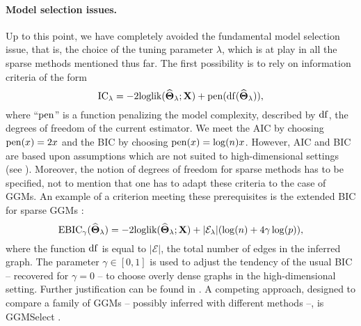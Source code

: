 
\paragraph*{Model  selection  issues.}   Up  to this  point,  we  have
completely avoided the fundamental model selection issue, that is, the
choice of the tuning parameter $\lambda$,  which is at play in all the
sparse methods mentioned  thus far.  The first possibility  is to rely
on information criteria of the form
\begin{equation*}
  \textrm{IC}_\lambda = - 2 \textrm{loglik}(\widehat{\boldsymbol\Theta}_\lambda;\mathbf{X}) + \mathrm{pen}(\mathrm{df}(\widehat{\boldsymbol\Theta}_\lambda)),
\end{equation*}
where  ``$\mathrm{pen}$''  is  a  function penalizing  the  model  complexity,
described by $\mathrm{df}$,  the degrees of freedom of  the current estimator.
We meet the AIC  by choosing $\mathrm{pen}(x) = 2 x $ and  the BIC by choosing
$\mathrm{pen}(x)  =  \log(n)  x$.   However,   AIC  and  BIC  are  based  upon
assumptions  which are  not suited  to high-dimensional  settings (see
\cite{2012_SS_Giraud}).  Moreover,  the notion  of degrees  of freedom
for sparse methods has to be specified, not to mention that one has to
adapt these criteria  to the case of GGMs.  An  example of a criterion
meeting  these  prerequisites is  the  extended  BIC for  sparse  GGMs
\cite{foygel2010extended}:
\begin{equation}
  \label{eq:EBIC_ggm}
  \text{EBIC}_\gamma(\widehat{\invcov}_\lambda)  =   -2 \textrm{loglik}
  (\widehat{\invcov}_\lambda;\bX) + |\mathcal{E}_\lambda| (\log(n) + 4 \gamma \log(p) ),
\end{equation}
where the function $\mathrm{df}$ is equal to $|\mathcal{E}|$, the total number
of edges  in the  inferred graph. The  parameter $\gamma\in  [0,1]$ is
used  to  adjust the  tendency  of  the  usual  BIC --  recovered  for
$\gamma=0$ --  to choose overly  dense graphs in  the high-dimensional
setting.      Further     justification     can    be     found     in
\cite{foygel2010extended}. A competing approach, designed to compare a
family  of GGMs -- possibly  inferred  with different  methods --,  is
GGMSelect \cite{2012_SAGMB_Giraud,giraud2008estimation}.

